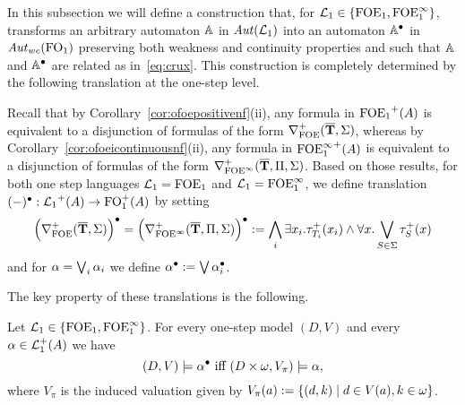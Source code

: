 
In this subsection we will define a construction that, for $\mathcal{L}_1 \in \{{\mathrm{FOE}_1},{\mathrm{FOE}^{\infty}_1}\}$,  transforms an arbitrary automaton
$\mathbb{A}$ in $\mathit{Aut}(\mathcal{L}_1)$ into an automaton $\mathbb{A}^{\bullet}$ in 
$\mathit{Aut}_{wc}(\mathrm{FO}_1)$ preserving both weakness and continuity properties and such that $\mathbb{A}$ and $\mathbb{A}^{\bullet}$ are related as 
in~\eqref{eq:crux}.
This construction is completely determined by the following translation at the
one-step level.

Recall that by Corollary~\ref{cor:ofoepositivenf}(ii), any formula in ${\mathrm{FOE}_1}^+(A)$ is 
equivalent to a disjunction of formulas of the form 
$\nabla^+_{\mathrm{FOE}}(\overline{{\mathbf{T}}},\Sigma)$, whereas
by Corollary~\ref{cor:ofoeicontinuousnf}(ii), any formula in ${\mathrm{FOE}^{\infty}_1}^+(A)$ is 
equivalent to a disjunction of formulas of the form 
$\nabla^+_{{\mathrm{FOE}}^\infty}(\overline{{\mathbf{T}}},\Pi,\Sigma)$. Based on those results, for both one step languages $\mathcal{L}_1={\mathrm{FOE}_1}$ and $\mathcal{L}_1={\mathrm{FOE}^{\infty}_1}$, we define 
translation 
$(-)^{\bullet} : {\mathcal{L}_1}^+(A) \to \mathrm{FO}_1^+(A)$ by setting
\[
\Big( \nabla^+_{\mathrm{FOE}}(\overline{{\mathbf{T}}},\Sigma) \Big)^{\bullet} = \Big( \nabla^+_{{\mathrm{FOE}}^\infty}(\overline{{\mathbf{T}}},\Pi,\Sigma) \Big)^{\bullet} \mathrel{: =}
\bigwedge_{i} \exists x_i. \tau^+_{T_i}(x_i) \land \forall x. \bigvee_{S\in\Sigma} \tau^+_S(x)
\]
and for $\alpha = \bigvee_{i} \alpha_{i}$ we define $\alpha^{\bullet} \mathrel{: =} \bigvee 
\alpha_{i}^{\bullet}$.

The key property of these translations is the following.

\begin{proposition}
\label{p-1P}
Let $\mathcal{L}_1\in \{{\mathrm{FOE}_1},{\mathrm{FOE}^{\infty}_1}\}$.
For every one-step model $(D,V)$ and every $\alpha \in \mathcal{L}_1^+(A)$ we have
\begin{equation}
\label{eq-1cr}
(D,V) \models \alpha^{\bullet} \text{ iff } (D\times \om,V_\pi) \models \alpha,
\end{equation}
where $V_{\pi}$ %
 is the induced valuation given by 
$V_{\pi}(a) \mathrel{: =} \{ (d,k) \mid d \in V(a), k\in\omega\}$.
\end{proposition}


